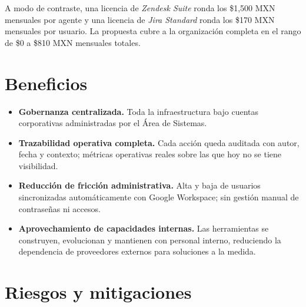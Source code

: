 \documentclass[12pt,a4paper]{article}
\begin{document}
A modo de contraste, una licencia de \emph{Zendesk Suite}
ronda los \$1{,}500 MXN mensuales por agente
y una licencia de \emph{Jira Standard} ronda los \$170 MXN mensuales por usuario.
La propuesta cubre a la organización completa
en el rango de \$0 a \$810 MXN mensuales totales.

\section{Beneficios}

\begin{itemize}
  \item \textbf{Gobernanza centralizada.}
        Toda la infraestructura bajo cuentas corporativas
        administradas por el Área de Sistemas.
  \item \textbf{Trazabilidad operativa completa.}
        Cada acción queda auditada con autor, fecha y contexto;
        métricas operativas reales sobre las que hoy no se tiene visibilidad.
  \item \textbf{Reducción de fricción administrativa.}
        Alta y baja de usuarios sincronizadas automáticamente
        con Google Workspace; sin gestión manual de contraseñas ni accesos.
  \item \textbf{Aprovechamiento de capacidades internas.}
        Las herramientas se construyen, evolucionan y mantienen con personal interno,
        reduciendo la dependencia de proveedores externos para soluciones a la medida.
\end{itemize}

\section{Riesgos y mitigaciones}
\end{document}
